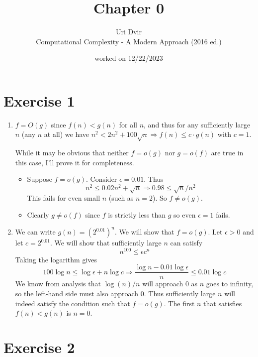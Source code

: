 \documentclass[12pt]{article}
\title{Chapter 0}
\author{Uri Dvir \\ Computational Complexity - A Modern Approach (2016 ed.)}
\date{worked on 12/22/2023}
\begin{document}
\maketitle

\section*{Exercise 1}

\begin{enumerate}
\item{
$f = O(g)$ since $f(n) < g(n)$ for all $n$, and thus for any sufficiently large $n$ (any $n$ at all) we have $n^2 < 2n^2 + 100\sqrt{n} \Rightarrow f(n) \leq c \cdot g(n)$ with $c = 1$.

\noindent
While it may be obvious that neither $f = o(g)$ nor $g = o(f)$ are true in this case, I'll prove it for completeness.
\begin{itemize}
\item{Suppose $f = o(g)$. Consider $\epsilon = 0.01$. Thus
$$
n^2 \leq 0.02n^2 + \sqrt{n} \Rightarrow 0.98 \leq \sqrt{n}/n^2
$$
This fails for even small $n$ (such as $n=2$). So $f \neq o(g)$.}
\item{Clearly $g \neq o(f)$ since $f$ is strictly less than $g$ so even $\epsilon = 1$ fails.}
\end{itemize}
}
\item{
We can write $g(n) = (2^{0.01})^n$. We will show that $f = o(g)$. Let $\epsilon > 0$ and let $c = 2^{0.01}$. We will show that sufficiently large $n$ can satisfy
$$
n^{100} \leq \epsilon c^n
$$
Taking the logarithm gives
$$
100 \log n \leq \log \epsilon + n \log c
\Rightarrow
\frac{\log n - 0.01 \log \epsilon}{n} \leq 0.01\log c
$$
We know from analysis that $\log(n)/n$ will approach 0 as $n$ goes to infinity, so the left-hand side must also approach 0. Thus sufficiently large $n$ will indeed satisfy the condition such that $f = o(g)$. The first $n$ that satisfies $f(n) < g(n)$ is $n=0$.
}
\end{enumerate}

\section*{Exercise 2}
\end{document}
